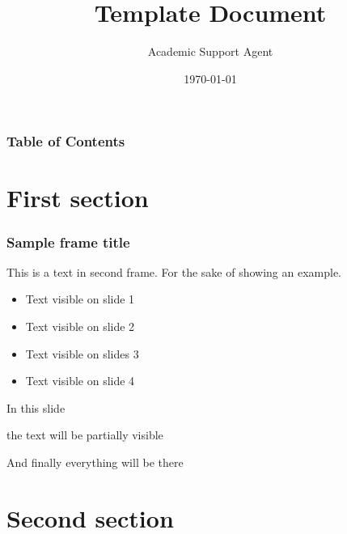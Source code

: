 \documentclass{article}
\title{Template Document}
\author{Academic Support Agent}
\date{\today}
\begin{document}
\maketitle

\frame{\titlepage}


\begin{frame}
\frametitle{Table of Contents}

\end{frame}


\section{First section}

\begin{frame}
\frametitle{Sample frame title}
This is a text in second frame. For the sake of showing an example.

\begin{itemize}
    \item<1-> Text visible on slide 1
    \item<2-> Text visible on slide 2
    \item<3> Text visible on slides 3
    \item<4-> Text visible on slide 4
\end{itemize}
\end{frame}



\begin{frame}
In this slide \pause

the text will be partially visible \pause

And finally everything will be there
\end{frame}

\section{Second section}
\end{document}
